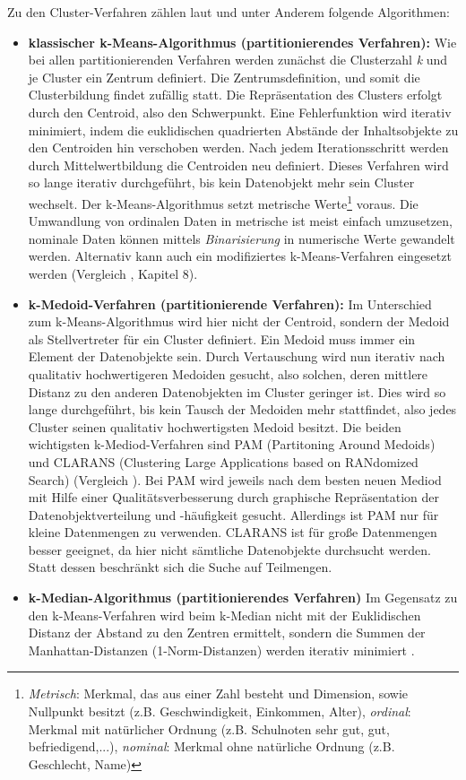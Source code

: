 Zu den Cluster-Verfahren zählen laut  und  unter Anderem folgende Algorithmen:

\begin{itemize}
		\item \textbf{klassischer k-Means-Algorithmus (partitionierendes Verfahren):} Wie bei allen partitionierenden Verfahren werden zunächst die Clusterzahl \textit{k} und je Cluster ein Zentrum definiert. Die Zentrumsdefinition, und somit die Clusterbildung findet zufällig statt. Die Repräsentation des Clusters erfolgt durch den Centroid, also den Schwerpunkt. Eine Fehlerfunktion wird iterativ minimiert, indem die euklidischen quadrierten Abstände der Inhaltsobjekte zu den Centroiden hin verschoben werden. Nach jedem Iterationsschritt werden durch Mittelwertbildung die Centroiden neu definiert. Dieses Verfahren wird so lange iterativ durchgeführt, bis kein Datenobjekt mehr sein Cluster wechselt. Der k-Means-Algorithmus setzt metrische Werte\footnote{\textit{Metrisch}: Merkmal, das aus einer Zahl besteht und Dimension, sowie Nullpunkt besitzt (z.B. Geschwindigkeit, Einkommen, Alter), \textit{ordinal}: Merkmal mit natürlicher Ordnung (z.B. Schulnoten sehr gut, gut, befriedigend,...), \textit{nominal}: Merkmal ohne natürliche Ordnung (z.B. Geschlecht, Name)} voraus. Die Umwandlung von ordinalen Daten in metrische ist meist einfach umzusetzen, nominale Daten können mittels \textit{Binarisierung} in numerische Werte gewandelt werden. Alternativ kann auch ein modifiziertes k-Means-Verfahren eingesetzt werden (Vergleich , Kapitel 8).
		\item \textbf{k-Medoid-Verfahren (partitionierende Verfahren):} Im Unterschied zum k-Means-Algorithmus wird hier nicht der Centroid, sondern der Medoid als Stellvertreter für ein Cluster definiert. Ein Medoid muss immer ein Element der Datenobjekte sein. Durch Vertauschung wird nun iterativ nach qualitativ hochwertigeren Medoiden gesucht, also solchen, deren mittlere Distanz zu den anderen Datenobjekten im Cluster geringer ist. Dies wird so lange durchgeführt, bis kein Tausch der Medoiden mehr stattfindet, also jedes Cluster seinen qualitativ hochwertigsten Medoid besitzt. Die beiden wichtigsten k-Mediod-Verfahren sind PAM (Partitoning Around Medoids) und CLARANS (Clustering Large Applications based on RANdomized Search) (Vergleich ). Bei PAM wird jeweils nach dem besten neuen Mediod mit Hilfe einer Qualitätsverbesserung durch graphische Repräsentation der Datenobjektverteilung und -häufigkeit gesucht. Allerdings ist PAM nur für kleine Datenmengen zu verwenden. CLARANS ist für große Datenmengen besser geeignet, da hier nicht sämtliche Datenobjekte durchsucht werden. Statt dessen beschränkt sich die Suche auf Teilmengen.   
		\item \textbf{k-Median-Algorithmus (partitionierendes Verfahren)} Im Gegensatz zu den k-Means-Verfahren wird beim k-Median nicht mit der Euklidischen Distanz der Abstand zu den Zentren ermittelt, sondern die Summen der Manhattan-Distanzen (1-Norm-Distanzen) werden iterativ minimiert .


\end{itemize}
